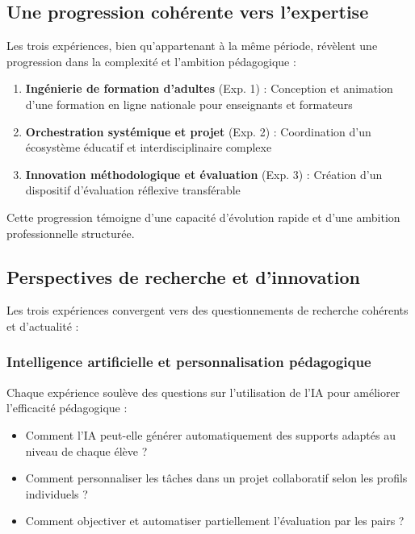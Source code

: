 \subsection{Une progression cohérente vers l'expertise}

Les trois expériences, bien qu'appartenant à la même période, révèlent une progression dans la complexité et l'ambition pédagogique :

\begin{enumerate}[leftmargin=*]
    \item \textbf{Ingénierie de formation d'adultes} (Exp. 1) : Conception et animation d'une formation en ligne nationale pour enseignants et formateurs
    \item \textbf{Orchestration systémique et projet} (Exp. 2) : Coordination d'un écosystème éducatif et interdisciplinaire complexe
    \item \textbf{Innovation méthodologique et évaluation} (Exp. 3) : Création d'un dispositif d'évaluation réflexive transférable
\end{enumerate}

Cette progression témoigne d'une capacité d'évolution rapide et d'une ambition professionnelle structurée.

\subsection{Perspectives de recherche et d'innovation}

Les trois expériences convergent vers des questionnements de recherche cohérents et d'actualité :

\subsubsection{Intelligence artificielle et personnalisation pédagogique}

Chaque expérience soulève des questions sur l'utilisation de l'IA pour améliorer l'efficacité pédagogique :
\begin{itemize}[leftmargin=*]
    \item Comment l'IA peut-elle générer automatiquement des supports adaptés au niveau de chaque élève ?
    \item Comment personnaliser les tâches dans un projet collaboratif selon les profils individuels ?
    \item Comment objectiver et automatiser partiellement l'évaluation par les pairs ?
\end{itemize}

